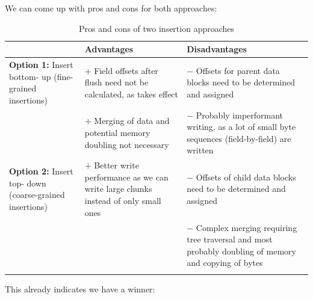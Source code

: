 We can come up with pros and cons for both approaches:
\begin{longtable}{|p{}|p{}|p{}|}
	\hline
	\rowcolor[gray]{.9} & \textbf{Advantages} & \textbf{Disadvantages} \\
	\endhead
	\hline
        \textbf{Option 1:} Insert bottom- up (fine-grained insertions) & 
	$+$ Field offsets after flush need not be calculated, as \DesLink{dd:418b} takes effect & $-$ Offsets for parent data blocks need to be determined and assigned  \\
	\hline
         & 
	$+$ Merging of data and potential memory doubling not necessary & $-$ Probably imperformant writing, as a lot of small byte sequences (field-by-field) are written \\
	\hline \textbf{Option 2:} Insert top- down (coarse-grained insertions) & 
  $+$ Better write performance as we can write large chunks instead of only small ones & $-$ Offsets of child data blocks need to be determined and assigned \\
	\hline
         & 
	& $-$ Complex merging requiring tree traversal and most probably doubling of memory and copying of bytes \\
	\hline
\caption{Pros and cons of two insertion approaches}
\label{tab:InsertProCon}
\end{longtable}

This already indicates we have a winner:

